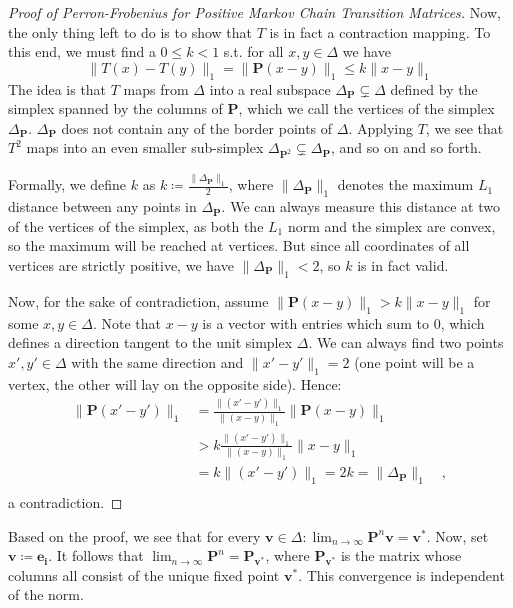 \documentclass[../../main.tex]{subfiles}
\begin{document}
\begin{proof}[Proof of Perron-Frobenius for Positive Markov Chain Transition Matrices]
    \smallskip
    Now, the only thing left to do is to show that $T$ is in fact a contraction mapping. To this end, we must find a $0 \leq k < 1$ s.t. for all $x, y \in \Delta$ we have
    \[
        \|T(x) - T(y)\|_1 = \|\bm{P} (x - y)\|_1 \leq k \|x - y\|_1
    \]
    The idea is that $T$ maps from $\Delta$ into a real subspace $\Delta_{\bm{P}} \subsetneq \Delta$ defined by the simplex spanned by the columns of $\bm{P}$, which we call the vertices of the simplex $\Delta_{\bm{P}}$. $\Delta_{\bm{P}}$ does not contain any of the border points of $\Delta$. Applying $T$, we see that $T^2$ maps into an even smaller sub-simplex $\Delta_{\bm{P}^2} \subsetneq \Delta_{\bm{P}}$, and so on and so forth.

    Formally, we define $k$ as $k \coloneqq \frac{\|\Delta_{\bm{P}}\|_1}{2}$, where $\|\Delta_{\bm{P}}\|_1$ denotes the maximum $L_1$ distance between any points in $\Delta_{\bm{P}}$. We can always measure this distance at two of the vertices of the simplex, as both the $L_1$ norm and the simplex are convex, so the maximum will be reached at vertices. But since all coordinates of all vertices are strictly positive, we have $\|\Delta_{\bm{P}}\|_1 < 2$, so $k$ is in fact valid.

    Now, for the sake of contradiction, assume $\|\bm{P} (x - y)\|_1 > k \|x - y\|_1$ for some $x, y \in \Delta$. Note that $x - y$ is a vector with entries which sum to $0$, which defines a direction tangent to the unit simplex $\Delta$. We can always find two points $x', y' \in \Delta$ with the same direction and $\|x' - y'\|_1 = 2$ (one point will be a vertex, the other will lay on the opposite side). Hence:
    \begin{align*}
        \|\bm{P} (x' - y')\|_1 &= \frac{\|(x' - y')\|_1}{\|(x - y)\|_1} \|\bm{P} (x - y)\|_1 \\
        &> k \frac{\|(x' - y')\|_1}{\|(x - y)\|_1} \|x - y\|_1 \\
        &= k \|(x' - y')\|_1 = 2k = \|\Delta_{\bm{P}}\|_1 \quad , \\
    \end{align*}
    a contradiction.
\end{proof}

\begin{corollary}
    Based on the proof, we see that for every $\bm{v} \in \Delta: \lim_{n \to \infty} \bm{P}^n \bm{v} = \bm{v}^*$. Now, set $\bm{v} \coloneqq \bm{e_i}$. It follows that $\lim_{n \to \infty} \bm{P}^n = \bm{P}_{\bm{v}^*}$, where $\bm{P}_{\bm{v}^*}$ is the matrix whose columns all consist of the unique fixed point $\bm{v}^*$. This convergence is independent of the norm.
\end{corollary}
\end{document}
